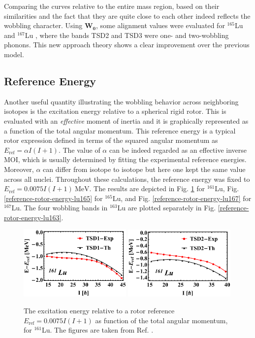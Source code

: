 Comparing the curves relative to the entire mass region, based on their similarities and the fact that they are quite close to each other indeed reflects the wobbling character. Using $\mathbf{W_0}$, some alignment values were evaluated for $^{165}$Lu and $^{167}$Lu \cite{raduta2018wobbling}, where the bands TSD2 and TSD3 were one- and two-wobbling phonons. This new approach theory shows a clear improvement over the previous model.

\subsection{Reference Energy}

Another useful quantity illustrating the wobbling behavior across neighboring isotopes is the excitation energy relative to a spherical rigid rotor. This is evaluated with an \emph{effective} moment of inertia and it is graphically represented as a function of the total angular momentum. This reference energy is a typical rotor expression defined in terms of the squared angular momentum as $E_\text{ref}=\alpha I(I+1)$. The value of $\alpha$ can be indeed regarded as an effective inverse MOI, which is usually determined by fitting the experimental reference energies. Moreover, $\alpha$ can differ from isotope to isotope but here one kept the same value across all nuclei. Throughout these calculations, the reference energy was fixed to $E_\text{ref}=0.0075I(I+1)\ \text{MeV}$. The results are depicted in Fig. \ref{reference-rotor-energy-lu161} for $^{161}$Lu, Fig. \ref{reference-rotor-energy-lu165} for $^{165}$Lu, and Fig. \ref{reference-rotor-energy-lu167} for $^{167}$Lu. The four wobbling bands in $^{163}$Lu are plotted separately in Fig. \ref{reference-rotor-energy-lu163}.
\begin{figure}
    \centering
    \includegraphics[width=0.49\textwidth]{Chapters/Figures/Lu-exp-energies/fig11a_lu161.pdf}
    \includegraphics[width=0.49\textwidth]{Chapters/Figures/Lu-exp-energies/fig11b_lu161.pdf}
    \caption{The excitation energy relative to a rotor reference $E_\text{ref}=0.0075I(I+1)$ as function of the total angular momentum, for $^{161}$Lu. The figures are taken from Ref. \cite{raduta2020approach}.}
    \label{reference-rotor-energy-lu161}
\end{figure}
